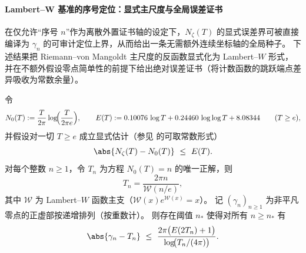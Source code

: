 \paragraph{Lambert--W 基准的序号定位：显式主尺度与全局误差证书}
在仅允许“序号 \(n\)”作为离散外置证书轴的设定下，\(N_\zeta(T)\) 的显式误差界可被直接编译为 \(\gamma_n\) 的可审计定位上界，从而给出一条无需额外连续坐标轴的全局种子。
下述结果把 Riemann--von Mangoldt 主尺度的反函数显式化为 Lambert--\(W\) 形式，并在不额外假设零点简单性的前提下给出绝对误差证书（将计数函数的跳跃端点差异吸收为常数余量）。

\begin{theorem}\label{thm:xi-lambertW-zero-indexing-explicit}
令
\[
N_0(T):=\frac{T}{2\pi}\log\!\Bigl(\frac{T}{2\pi e}\Bigr),
\qquad
E(T):=0.10076\,\log T+0.24460\,\log\log T+8.08344\qquad(T\ge e),
\]
并假设对一切 \(T\ge e\) 成立显式估计（参见 \cite{BellottiWong2024ImprovedNT} 的可取常数形式）
\begin{equation}\label{eq:xi-explicit-zero-counting-bound}
\abs{N_\zeta(T)-N_0(T)}\ \le\ E(T).
\end{equation}
对每个整数 \(n\ge 1\)，令 \(T_n\) 为方程 \(N_0(T)=n\) 的唯一正解，则
\begin{equation}\label{eq:xi-Tn-lambertW}
T_n=\frac{2\pi n}{\mathscr{W}(n/e)},
\end{equation}
其中 \(\mathscr{W}\) 为 Lambert--\(W\) 函数主支（\(\mathscr{W}(x)e^{\mathscr{W}(x)}=x\)）。
记 \((\gamma_n)_{n\ge 1}\) 为非平凡零点的正虚部按递增排列（按重数计）。
则存在阈值 \(n_\ast\) 使得对所有 \(n\ge n_\ast\) 有
\begin{equation}\label{eq:xi-lambertW-gamman-bound}
\abs{\gamma_n-T_n}
\ \le\
\frac{2\pi\bigl(E(2T_n)+1\bigr)}{\log\!\bigl(T_n/(4\pi)\bigr)}.
\end{equation}
\end{theorem}
